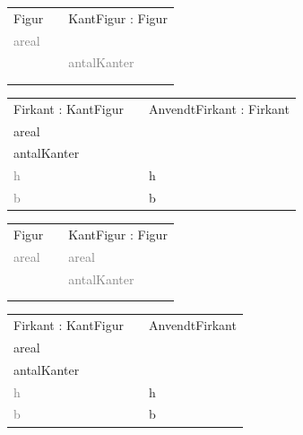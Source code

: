 \begin{frame}[fragile] 
\begin{table}[h]
\begin{tabular}{|l|l|l|}
 \cline{1-1} \cline{3-3} 
Figur          &  & KantFigur : Figur    \\ \cline{1-1} \cline{3-3} 
\textcolor{gray}{areal} &  &                      \\
               &  &  \textcolor{gray}{antalKanter} \\
               &  &                      \\
               &  &                      \\ \cline{1-1} \cline{3-3} 
\end{tabular}
\end{table}
\begin{table}[h]
\begin{tabular}{|l|l|l|}
 \cline{1-1} \cline{3-3} 
 Firkant : KantFigur &  & AnvendtFirkant : Firkant    \\ \cline{1-1} \cline{3-3} 
areal      &  &                      \\
antalKanter     &  &                      \\
\textcolor{gray}{h}          &  & h               \\
\textcolor{gray}{b}          &  & b              \\ \cline{1-1} \cline{3-3} 
\end{tabular}
\end{table}
\end{frame}

\begin{frame}[fragile] 
\begin{table}[h]
\begin{tabular}{|l|l|l|}
 \cline{1-1} \cline{3-3} 
Figur          &  & KantFigur : Figur    \\ \cline{1-1} \cline{3-3} 
\textcolor{gray}{areal} &  & \textcolor{gray}{areal}       \\
               &  & \textcolor{gray}{antalKanter} \\
               &  &                      \\
               &  &                      \\ \cline{1-1} \cline{3-3} 
\end{tabular}
\end{table}
\begin{table}[h]
\begin{tabular}{|l|l|l|}
 \cline{1-1} \cline{3-3} 
Firkant : KantFigur &  & AnvendtFirkant       \\ \cline{1-1} \cline{3-3} 
areal               &  &                      \\
antalKanter         &  &                      \\
\textcolor{gray}{h}          &  & h                    \\
\textcolor{gray}{b}          &  & b                    \\ \cline{1-1} \cline{3-3} 
\end{tabular}
\end{table} 	
\end{frame}

